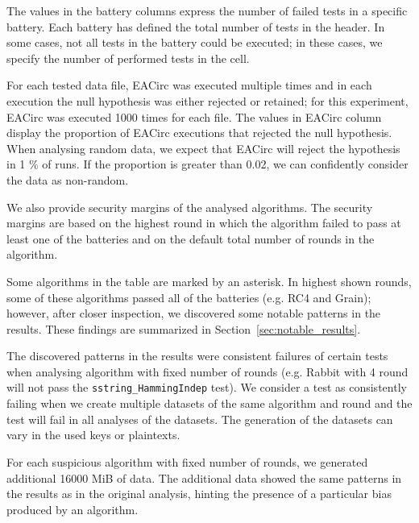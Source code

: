 \documentclass[
  digital,  	%
  color,		%
  oneside,   	%
  12pt,
  nocover,
  notable,
  nolof,
  nolot,
]{fithesis3}
\theoremstyle{definition}
\theoremstyle{remark}
\begin{document}
The values in the battery columns express the number of failed tests in a specific battery. Each battery has defined the total number of tests in the header. In some cases, not all tests in the battery could be executed; in these cases, we specify the number of performed tests in the cell. 

For each tested data file, EACirc was executed multiple times and in each execution the null hypothesis was either rejected or retained; for this experiment, EACirc was executed 1000 times for each file. The values in EACirc column display the proportion of EACirc executions that rejected the null hypothesis. When analysing random data, we expect that EACirc will reject the hypothesis in 1 \% of runs. If the proportion is greater than 0.02, we can confidently consider the data as non-random.

We also provide security margins of the analysed algorithms. The security margins are based on the highest round in which the algorithm failed to pass at least one of the batteries and on the default total number of rounds in the algorithm.

Some algorithms in the table are marked by an asterisk. In highest shown rounds, some of these algorithms passed all of the batteries (e.g. RC4 and Grain); however, after closer inspection, we discovered some notable patterns in the results. These findings are summarized in Section~\ref{sec:notable_results}.

The discovered patterns in the results were consistent failures of certain tests when analysing algorithm with fixed number of rounds (e.g. Rabbit with 4 round will not pass the \texttt{sstring\_HammingIndep} test). We consider a test as consistently failing when we create multiple datasets of the same algorithm and round and the test will fail in all analyses of the datasets. The generation of the datasets can vary in the used keys or plaintexts.

For each suspicious algorithm with fixed number of rounds, we generated additional 16000 MiB of data. The additional data showed the same patterns in the results as in the original analysis, hinting the presence of a particular bias produced by an algorithm.
\end{document}
